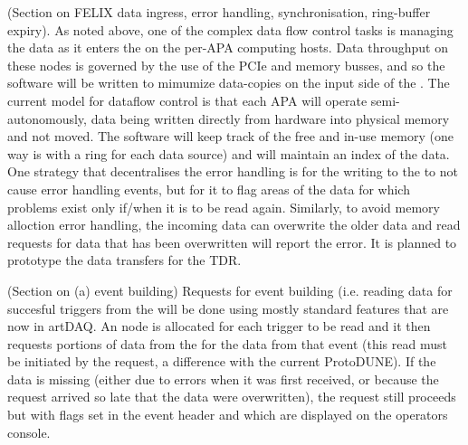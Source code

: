 (Section on FELIX data ingress, error handling, synchronisation,
ring-buffer expiry). 
As noted above, one of the complex data flow control tasks is managing
the data as it enters the  on the per-APA 
computing hosts. 
Data throughput on these nodes is governed by the use of the PCIe and
memory busses, and so the software will be written to mimumize
data-copies on the input side of the .
The current model for dataflow control is that each APA will operate
semi-autonomously, data being written directly from hardware into physical
memory and not moved. 
The software will keep track of the free and in-use memory (one way is
with a ring for each data source) and will maintain an index of the
data. 
One strategy that decentralises the error handling is for the writing
to the  to not cause error handling events, but
for it to flag areas of the data for which problems exist only if/when
it is to be read again. 
Similarly, to avoid memory alloction error handling, the incoming data
can overwrite the older data and read requests for data that has been
overwritten will report the error. 
It is planned to prototype the data transfers for the TDR.

(Section on (a) event building) Requests for event building
(i.e. reading data for succesful triggers from the 
will be done using mostly standard features that are now in artDAQ. 
An  node is allocated for each trigger to be read and it
then requests portions of data from the  for the
data from that event (this read must be initiated by the request, a
difference with the current ProtoDUNE).
If the data is missing (either due to errors when it was first
received, or because the request arrived so late that the data were
overwritten), the request still proceeds but with flags set in the event
header and which are displayed on the operators console.

